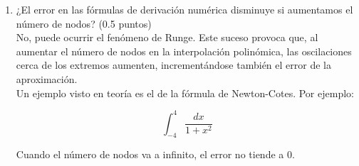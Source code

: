 \documentclass[12pt]{article}
\begin{document}
\begin{ejercicio}[2 puntos]
\begin{enumerate}
          \item ¿El error en las fórmulas de derivación numérica disminuye si aumentamos el número de nodos? (0.5 puntos) \\
          
          No, puede ocurrir el fenómeno de Runge. Este suceso provoca que, al aumentar el número de nodos en la interpolación polinómica, las oscilaciones cerca de los extremos aumenten, incrementándose también el error de la aproximación. \\

          Un ejemplo visto en teoría es el de la fórmula de Newton-Cotes. Por ejemplo: 

          $$\int_{-4}^{4} \dfrac{dx}{1+x^2}$$

          Cuando el número de nodos va a infinito, el error no tiende a $0$.

        \end{enumerate}
    \end{ejercicio}
\end{document}
